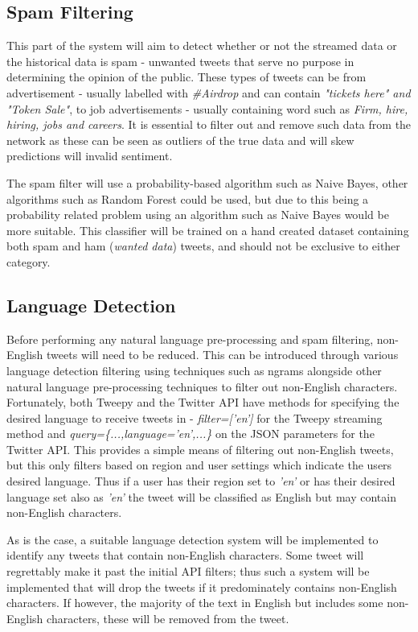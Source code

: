 \documentclass[oneside, 12pt]{article}
\begin{document}
		\subsection{Spam Filtering}
		This part of the system will aim to detect whether or not the streamed data or the historical data is spam - unwanted tweets that serve no purpose in determining the opinion of the public. These types of tweets can be from advertisement - usually labelled with \textit{\#Airdrop} and can contain \textit{"tickets here" and "Token Sale"}, to job advertisements - usually containing word such as \textit{Firm, hire, hiring, jobs and careers}. It is essential to filter out and remove such data from the network as these can be seen as outliers of the true data and will skew predictions will invalid sentiment.
		
		The spam filter will use a probability-based algorithm such as Naive Bayes, other algorithms such as Random Forest could be used, but due to this being a probability related problem using an algorithm such as Naive Bayes would be more suitable. This classifier will be trained on a hand created dataset containing both spam and ham (\textit{wanted data}) tweets, and should not be exclusive to either category.
		
		
		\subsection{Language Detection}
		Before performing any natural language pre-processing and spam filtering, non-English tweets will need to be reduced. This can be introduced through various language detection filtering using techniques such as ngrams alongside other natural language pre-processing techniques to filter out non-English characters. Fortunately, both Tweepy and the Twitter API have methods for specifying the desired language to receive tweets in - \textit{filter=['en']} for the Tweepy streaming method and \textit{query=\{...,language='en',...\}} on the JSON parameters for the Twitter API. This provides a simple means of filtering out non-English tweets, but this only filters based on region and user settings which indicate the users desired language. Thus if a user has their region set to \textit{'en'} or has their desired language set also as \textit{'en'} the tweet will be classified as English but may contain non-English characters. 
		
		As is the case, a suitable language detection system will be implemented to identify any tweets that contain non-English characters. Some tweet will regrettably make it past the initial API filters; thus such a system will be implemented that will drop the tweets if it predominately contains non-English characters. If however, the majority of the text in English but includes some non-English characters, these will be removed from the tweet.
		
\end{document}
